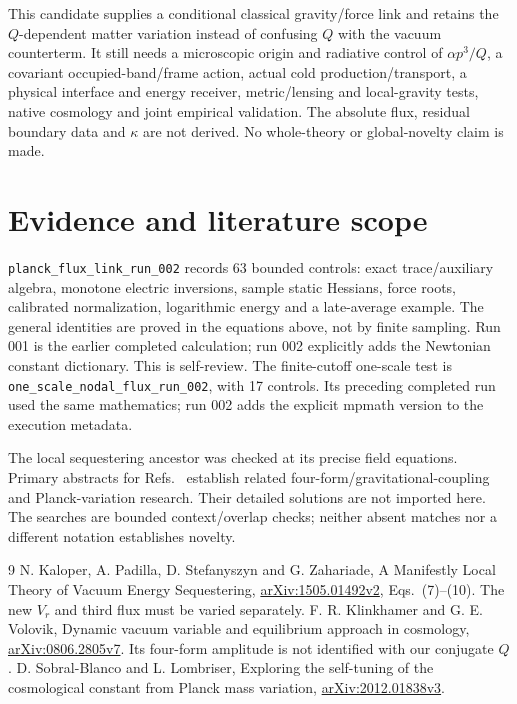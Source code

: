 \documentclass[11pt]{article}
\begin{document}
This candidate supplies a conditional classical gravity/force link and
retains the $Q$-dependent matter variation instead of confusing $Q$ with
the vacuum counterterm. It still needs a microscopic origin and radiative
control of $\alpha p^3/Q$, a covariant occupied-band/frame action, actual
cold production/transport, a physical interface and energy receiver,
metric/lensing and local-gravity tests, native cosmology and joint
empirical validation. The absolute flux, residual boundary data and
$\kappa$ are not derived. No whole-theory or global-novelty claim is made.

\section{Evidence and literature scope}
\texttt{planck\_flux\_link\_run\_002} records 63 bounded controls:
exact trace/auxiliary algebra, monotone electric inversions, sample static
Hessians, force roots, calibrated normalization, logarithmic energy and a
late-average example. The general identities are proved in the equations
above, not by finite sampling. Run 001 is the earlier completed calculation;
run 002 explicitly adds the Newtonian constant dictionary. This is self-review.
The finite-cutoff one-scale test is
\texttt{one\_scale\_nodal\_flux\_run\_002}, with 17 controls.
Its preceding completed run used the same mathematics; run 002 adds the
explicit mpmath version to the execution metadata.

The local sequestering ancestor was checked at its precise field equations.
Primary abstracts for Refs.~\cite{pf:qtheory,pf:planck} establish related
four-form/gravitational-coupling and Planck-variation research. Their detailed
solutions are not imported here. The searches are bounded context/overlap
checks; neither absent matches nor a different notation establishes novelty.

\begin{thebibliography}{9}
 N. Kaloper, A. Padilla, D. Stefanyszyn and
G. Zahariade, A Manifestly Local Theory of Vacuum Energy Sequestering,
\href{https://arxiv.org/pdf/1505.01492v2}{arXiv:1505.01492v2},
Eqs.~(7)--(10). The new $V_r$ and third flux must be varied separately.
 F. R. Klinkhamer and G. E. Volovik,
Dynamic vacuum variable and equilibrium approach in cosmology,
\href{https://arxiv.org/abs/0806.2805v7}{arXiv:0806.2805v7}.
Its four-form amplitude is not identified with our conjugate $Q$.
 D. Sobral-Blanco and L. Lombriser,
Exploring the self-tuning of the cosmological constant from Planck mass
variation, \href{https://arxiv.org/abs/2012.01838v3}{arXiv:2012.01838v3}.
\end{thebibliography}
\end{document}

